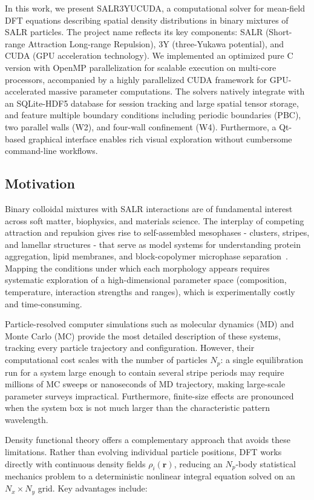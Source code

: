 \documentclass[conference]{IEEEtran}
\begin{document}
In this work, we present SALR3YUCUDA, a computational solver for mean-field DFT equations describing spatial density distributions in binary mixtures of SALR particles. The project name reflects its key components: SALR (Short-range Attraction Long-range Repulsion), 3Y (three-Yukawa potential), and CUDA (GPU acceleration technology). We implemented an optimized pure C version with OpenMP parallelization for scalable execution on multi-core processors, accompanied by a highly parallelized CUDA framework for GPU-accelerated massive parameter computations. The solvers natively integrate with an SQLite-HDF5 database for session tracking and large spatial tensor storage, and feature multiple boundary conditions including periodic boundaries (PBC), two parallel walls (W2), and four-wall confinement (W4). Furthermore, a Qt-based graphical interface enables rich visual exploration without cumbersome command-line workflows.

\subsection{Motivation}

Binary colloidal mixtures with SALR interactions are of fundamental interest across soft matter, biophysics, and materials science. The interplay of competing attraction and repulsion gives rise to self-assembled mesophases - clusters, stripes, and lamellar structures - that serve as model systems for understanding protein aggregation, lipid membranes, and block-copolymer microphase separation~\cite{royall2018,liu2019}. Mapping the conditions under which each morphology appears requires systematic exploration of a high-dimensional parameter space (composition, temperature, interaction strengths and ranges), which is experimentally costly and time-consuming.

Particle-resolved computer simulations such as molecular dynamics (MD) and Monte Carlo (MC) provide the most detailed description of these systems, tracking every particle trajectory and configuration. However, their computational cost scales with the number of particles $N_p$: a single equilibration run for a system large enough to contain several stripe periods may require millions of MC sweeps or nanoseconds of MD trajectory, making large-scale parameter surveys impractical. Furthermore, finite-size effects are pronounced when the system box is not much larger than the characteristic pattern wavelength.

Density functional theory offers a complementary approach that avoids these limitations. Rather than evolving individual particle positions, DFT works directly with continuous density fields $\rho_i(\mathbf{r})$, reducing an $N_p$-body statistical mechanics problem to a deterministic nonlinear integral equation solved on an $N_x \times N_y$ grid. Key advantages include:
\end{document}
